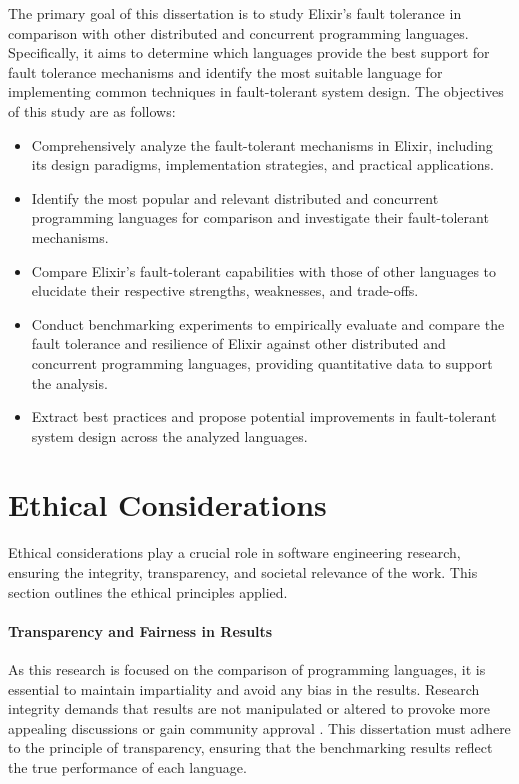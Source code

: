 The primary goal of this dissertation is to study Elixir’s fault tolerance in comparison with other distributed and concurrent programming languages. Specifically, it aims to determine which languages provide the best support for fault tolerance mechanisms and identify the most suitable language for implementing common techniques in fault-tolerant system design. The objectives of this study are as follows:

\begin{itemize}
    \item Comprehensively analyze the fault-tolerant mechanisms in Elixir, including its design paradigms, implementation strategies, and practical applications.
    \item Identify the most popular and relevant distributed and concurrent programming languages for comparison and investigate their fault-tolerant mechanisms.
    \item Compare Elixir’s fault-tolerant capabilities with those of other languages to elucidate their respective strengths, weaknesses, and trade-offs.
    \item Conduct benchmarking experiments to empirically evaluate and compare the fault tolerance and resilience of Elixir against other distributed and concurrent programming languages, providing quantitative data to support the analysis.
    \item Extract best practices and propose potential improvements in fault-tolerant system design across the analyzed languages.
\end{itemize}

\section{Ethical Considerations}

Ethical considerations play a crucial role in software engineering research, ensuring the integrity, transparency, and societal relevance of the work. This section outlines the ethical principles applied.

\paragraph{Transparency and Fairness in Results} As this research is focused on the comparison of programming languages, it is essential to maintain impartiality and avoid any bias in the results. Research integrity demands that results are not manipulated or altered to provoke more appealing discussions or gain community approval \cite{EthicDeb2018}. This dissertation must adhere to the principle of transparency, ensuring that the benchmarking results reflect the true performance of each language.

